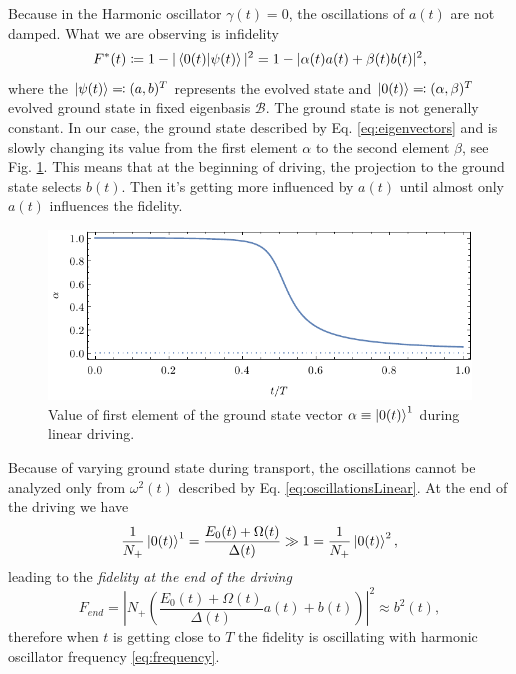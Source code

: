 Because in the Harmonic oscillator $\gamma(t)=0$, the oscillations of $a(t)$ are not damped. What we are observing is infidelity 
$$F^*(t)\coloneqq 1- |\braket{0(t)|\psi(t)}|^2 = 1-|\alpha(t)a(t)+\beta(t)b(t)|^2, $$
where the $\ket{\psi(t)}\eqqcolon(a,b)^T$ represents the evolved state and $\ket{0(t)}\eqqcolon(\alpha,\beta)^T$ evolved ground state in fixed eigenbasis $\mathcal{B}$. The ground state is not generally constant. In our case, the ground state described by Eq. \ref{eq:eigenvectors} and is slowly changing its value from the first element $\alpha$ to the second element $\beta$, see Fig. \ref{fig:zeroState}. This means that at the beginning of driving, the projection to the ground state selects $b(t)$. Then it's getting more influenced by $a(t)$ until almost only $a(t)$ influences the fidelity.
\begin{figure}[h]
    \centering
    \includegraphics[scale=1.2]{../img/zeroState.pdf}
    \caption{Value of first element of the ground state vector $\alpha\equiv \ket{0(t)}^1$ during linear driving.}
    \label{fig:zeroState}
\end{figure}

Because of varying ground state during transport, the oscillations cannot be analyzed only from $\omega^2(t)$ described by Eq. \ref{eq:oscillationsLinear}. At the end of the driving we have 
\begin{equation}
   \frac{1}{N_+} \ket{0(t)}^1=\frac{E_0(t)+\Omega(t)}{\Delta(t)}\gg 1 =\frac{1}{N_+} \ket{0(t)}^2,
\end{equation}
leading to the \emph{fidelity at the end of the driving}
\begin{equation}
    F_{end}= \left|N_+ \left(
        \frac{E_0(t)+\Omega(t)}{\Delta(t)} a(t)+b(t)
        \right)\right|^2 \approx b^2(t),
\end{equation}
therefore when $t$ is getting close to $T$ the fidelity is oscillating with  harmonic oscillator frequency \ref{eq:frequency}.




